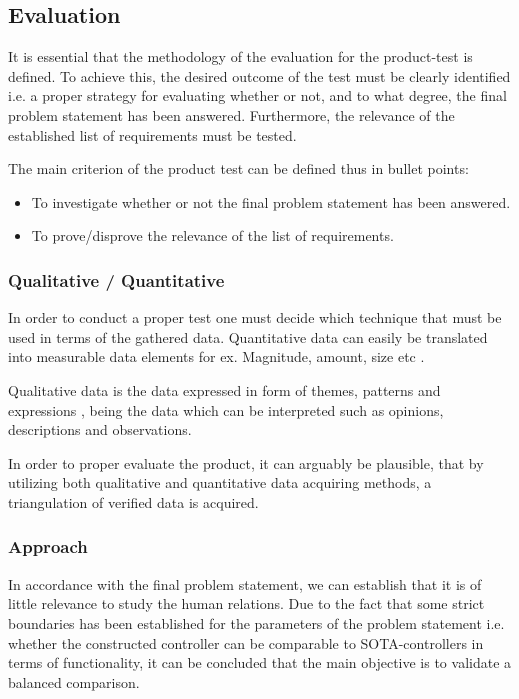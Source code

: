 \subsection{Evaluation}
It is essential that the methodology of the evaluation for the product-test is defined. To achieve this, the desired outcome of the test must be clearly identified i.e. a proper strategy for evaluating whether or not, and to what degree, the final problem statement has been answered. Furthermore, the relevance of the established list of requirements must be tested.

The main criterion of the product test can be defined thus in bullet points:
\begin{itemize}
\item To investigate whether or not the final problem statement has been answered.
\item To prove/disprove the relevance of the list of requirements.
\end{itemize}

\subsubsection{Qualitative / Quantitative }
In order to conduct a proper test one must decide which technique that must be used in terms of the gathered data. Quantitative data can easily be translated into measurable data elements for ex. Magnitude, amount, size etc \parencite{Rogers2002}.

Qualitative data is the data expressed in form of themes, patterns and expressions \parencite{Rogers2002}, being the data which can be interpreted such as opinions, descriptions and observations.

In order to proper evaluate the product, it can arguably be plausible, that by utilizing both qualitative and quantitative data acquiring methods, a triangulation of verified data is acquired.

\subsubsection{Approach}
In accordance with the final problem statement, we can establish that it is of little relevance to study the human relations. Due to the fact that some strict boundaries has been established for the parameters of the problem statement i.e. whether the constructed controller can be comparable to SOTA-controllers in terms of functionality, it can be concluded that the main objective is to validate a balanced comparison. 
\bigskip

